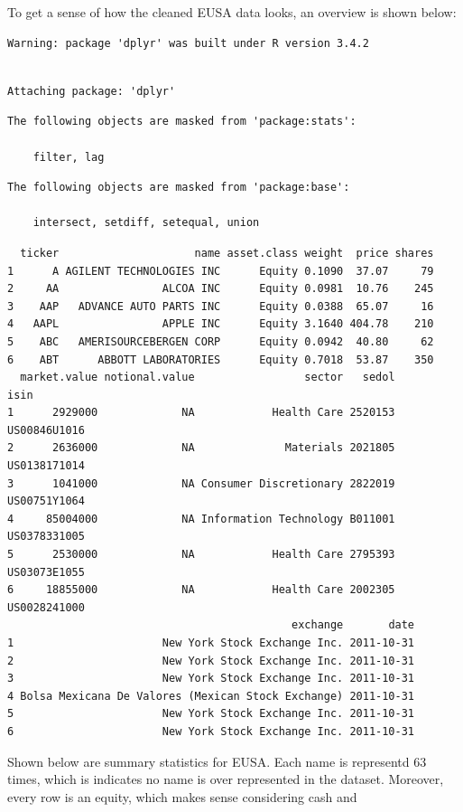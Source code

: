 \documentclass[12pt,twoside]{reedthesis}
\theoremstyle{definition}
\theoremstyle{definition}
\theoremstyle{definition}
\theoremstyle{remark}
\begin{document}
To get a sense of how the cleaned EUSA data looks, an overview is shown
below:
\begin{verbatim}
Warning: package 'dplyr' was built under R version 3.4.2
\end{verbatim}
\begin{verbatim}

Attaching package: 'dplyr'
\end{verbatim}
\begin{verbatim}
The following objects are masked from 'package:stats':

    filter, lag
\end{verbatim}
\begin{verbatim}
The following objects are masked from 'package:base':

    intersect, setdiff, setequal, union
\end{verbatim}
\begin{verbatim}
  ticker                     name asset.class weight  price shares
1      A AGILENT TECHNOLOGIES INC      Equity 0.1090  37.07     79
2     AA                ALCOA INC      Equity 0.0981  10.76    245
3    AAP   ADVANCE AUTO PARTS INC      Equity 0.0388  65.07     16
4   AAPL                APPLE INC      Equity 3.1640 404.78    210
5    ABC   AMERISOURCEBERGEN CORP      Equity 0.0942  40.80     62
6    ABT      ABBOTT LABORATORIES      Equity 0.7018  53.87    350
  market.value notional.value                 sector   sedol         isin
1      2929000             NA            Health Care 2520153 US00846U1016
2      2636000             NA              Materials 2021805 US0138171014
3      1041000             NA Consumer Discretionary 2822019 US00751Y1064
4     85004000             NA Information Technology B011001 US0378331005
5      2530000             NA            Health Care 2795393 US03073E1055
6     18855000             NA            Health Care 2002305 US0028241000
                                            exchange       date
1                       New York Stock Exchange Inc. 2011-10-31
2                       New York Stock Exchange Inc. 2011-10-31
3                       New York Stock Exchange Inc. 2011-10-31
4 Bolsa Mexicana De Valores (Mexican Stock Exchange) 2011-10-31
5                       New York Stock Exchange Inc. 2011-10-31
6                       New York Stock Exchange Inc. 2011-10-31
\end{verbatim}
Shown below are summary statistics for EUSA. Each name is representd 63
times, which is indicates no name is over represented in the dataset.
Moreover, every row is an equity, which makes sense considering cash and
\end{document}
